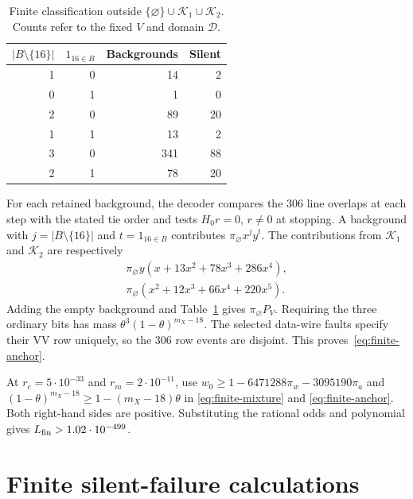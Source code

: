 \documentclass[10pt,twocolumn]{article}
\theoremstyle{definition}
\begin{document}
\begin{table}[!htb]
\centering\small
\caption{Finite classification outside $\{\varnothing\}\cup\mathcal K_1
\cup\mathcal K_2$. Counts refer to the fixed $V$ and domain $\mathcal D$.}
\label{tab:finite-coefficient}
\smallskip
\begin{tabular}{@{}rrrr@{}}
\toprule
$|B\setminus\{16\}|$ & $1_{16\in B}$ & Backgrounds & Silent\\
\midrule
1&0&14&2\\0&1&1&0\\2&0&89&20\\1&1&13&2\\
3&0&341&88\\2&1&78&20\\
\bottomrule
\end{tabular}
\end{table}

For each retained background, the decoder compares the $306$ line
overlaps at each step with the stated tie order and tests $H_0r=0$,
$r\ne0$ at stopping. A background with $j=|B\setminus\{16\}|$ and
$t=1_{16\in B}$ contributes $\pi_{\varnothing}x^jy^t$.
The contributions from $\mathcal K_1$ and
$\mathcal K_2$ are respectively
\[
\begin{gathered}
 \pi_{\varnothing}y(x+13x^2+78x^3+286x^4),\\
 \pi_{\varnothing}(x^2+12x^3+66x^4+220x^5).
\end{gathered}
\]
Adding the empty background and Table~\ref{tab:finite-coefficient} gives
$\pi_{\varnothing}P_V$. Requiring the three ordinary bits has mass
$\theta^3(1-\theta)^{m_X-18}$. The selected data-wire faults specify
their VV row uniquely, so the $306$ row events are disjoint.
This proves~\eqref{eq:finite-anchor}.

At $r_c=5\cdot10^{-33}$ and $r_m=2\cdot10^{-11}$,
use $w_0\ge1-6471288\pi_w-3095190\pi_a$ and
$(1-\theta)^{m_X-18}\ge1-(m_X-18)\theta$ in
\eqref{eq:finite-mixture} and \eqref{eq:finite-anchor}.
Both right-hand sides are positive. Substituting the rational
odds and polynomial gives $L_{\rm fin}>1.02\cdot10^{-499}$.

\section{Finite silent-failure calculations}\label{app:finite-detail}
\end{document}

